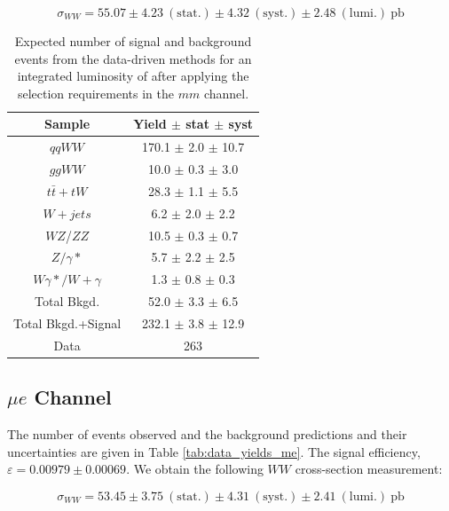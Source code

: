 \begin{equation*}
\sigma_{WW}  = 55.07 \pm 4.23~\mathrm{(stat.)} \pm 4.32~\mathrm{(syst.)} \pm 2.48~\mathrm{(lumi.)~pb}
\end{equation*}

\begin{table}[ht!]
  \begin{center}
  \begin{tabular} {|c|c|}
\hline
Sample                & Yield $\pm$ stat $\pm$ syst \\ \hline \hline
$qqWW$                & 170.1 $\pm$  2.0 $\pm$ 10.7  \\ \hline
$ggWW$                & 10.0 $\pm$  0.3 $\pm$  3.0  \\ \hline
$t\bar{t} + tW$      & 28.3 $\pm$  1.1 $\pm$  5.5  \\ \hline
$W+jets$              &  6.2 $\pm$  2.0 $\pm$  2.2  \\ \hline
$WZ$/$ZZ$             & 10.5 $\pm$  0.3 $\pm$  0.7  \\ \hline
$Z/\gamma*$          &  5.7 $\pm$  2.2 $\pm$  2.5  \\ \hline
$W\gamma*/W+\gamma$ &  1.3 $\pm$  0.8 $\pm$  0.3  \\ \hline \hline
Total Bkgd.           & 52.0 $\pm$  3.3 $\pm$  6.5  \\ \hline \hline
Total Bkgd.+Signal    & 232.1 $\pm$  3.8 $\pm$ 12.9  \\ \hline \hline
Data                  & 263 \\ \hline
\end{tabular}
  \caption{Expected number of signal and background events from the data-driven methods for
  an integrated luminosity of \intlumi after applying the selection requirements in the $mm$ channel.}
   \label{tab:data_yields_mm}
  \end{center}
\end{table}

%
%
%
\subsection{$\mu e$ Channel}

The number of events observed and the background predictions and their uncertainties are
given in Table \ref{tab:data_yields_me}.
The signal efficiency,  $\varepsilon = 0.00979 \pm 0.00069$.
We obtain the following $WW$ cross-section measurement:

\begin{equation*}
\sigma_{WW}  = 53.45 \pm 3.75~\mathrm{(stat.)} \pm 4.31~\mathrm{(syst.)} \pm 2.41~\mathrm{(lumi.)~pb} 
\end{equation*}

